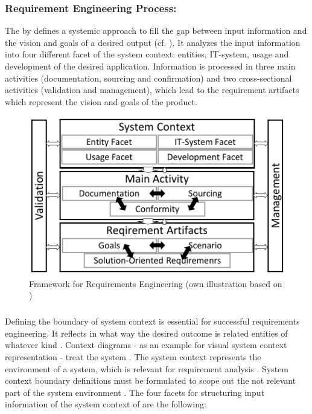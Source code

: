 \subsubsection{Requirement Engineering Process:} The by \textcite{Pohl.2007} defines a systemic approach to fill the gap between input information and the vision and goals of a desired output (cf. ). It analyzes the input information into four different facet of the system context: entities, IT-system, usage and development of the desired application. Information is processed in three main activities\label{mainactivity} (documentation, sourcing and confirmation) and two cross-sectional activities (validation and management), which lead to the requirement artifacts which represent the vision and goals of the product. \parencite[cf.][38-39]{Pohl.2007}
\begin{figure}[H]
    \centering
    \includegraphics[scale=1.5]{img/ReqAnFrameWork.pdf}
    \caption[Framework for Requirements Engineering]{Framework for Requirements Engineering (own illustration based on \cite[41]{Pohl.2007})}
    \label{fig:reqFramework}
\end{figure}
\subparagraph{} \label{beginFacets} Defining the boundary of system context is essential for successful requirements engineering. It reflects in what way the desired outcome is related entities of whatever kind \parencite[55]{Pohl.2007}. Context diagrams \parencites[cf.][266]{Kossiakoff.2011} - as an example for visual system context representation - treat the system  \parencite[76]{Lauesen.2008}. The system context represents the environment of a system, which is relevant for requirement analysis \parencite[55]{Pohl.2007}. System context boundary definitions must be formulated to scope out the not relevant part of the system environment \parencite[55-56]{Pohl.2007}. The four facets for structuring input information of the system context of \textcite{Pohl.2007} are the following:
